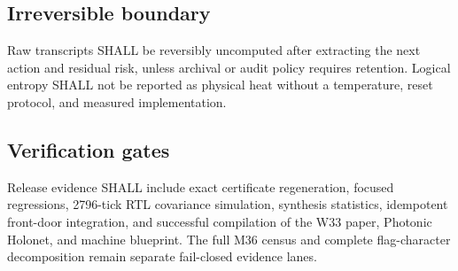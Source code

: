 \subsection{Irreversible boundary}
Raw transcripts SHALL be reversibly uncomputed after extracting the next action and
residual risk, unless archival or audit policy requires retention.  Logical entropy SHALL
not be reported as physical heat without a temperature, reset protocol, and measured
implementation.

\subsection{Verification gates}
Release evidence SHALL include exact certificate regeneration, focused regressions,
2796-tick RTL covariance simulation, synthesis statistics, idempotent front-door
integration, and successful compilation of the W33 paper, Photonic Holonet, and machine
blueprint.  The full M36 census and complete flag-character decomposition remain separate
fail-closed evidence lanes.
